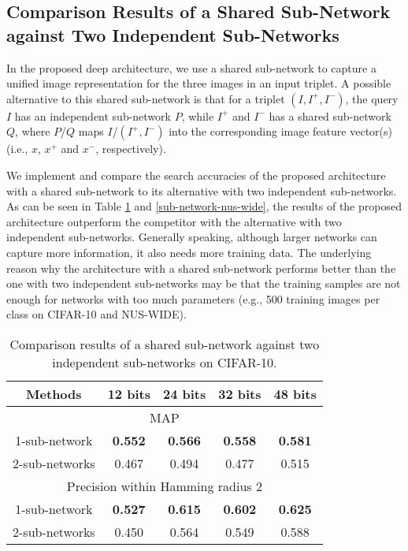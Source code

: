 \documentclass[10pt,twocolumn,letterpaper]{article}
\begin{document}
\subsection{Comparison Results of a Shared Sub-Network against Two Independent Sub-Networks}
In the proposed deep architecture, we use a shared sub-network to capture a unified image representation for the three images in an input
triplet. A possible alternative to this shared sub-network is that for a triplet $(I,I^+,I^-)$, the query $I$ has an independent sub-network $P$, while $I^+$ and $I^-$ has a shared sub-network $Q$, where $P$/$Q$ maps $I$/$(I^+,I^-)$ into the corresponding image
feature vector(s) (i.e., $x$, $x^+$ and $x^-$, respectively).

We implement and compare the search accuracies of the proposed architecture with a shared sub-network to its alternative with two independent sub-networks. As can be seen in Table \ref{sub-network-cifar} and \ref{sub-network-nus-wide}, the results of the proposed architecture outperform the competitor with the alternative with two independent sub-networks. Generally speaking, although larger networks can capture more information, it also needs more training data. The underlying reason why the architecture with a shared sub-network performs better than the one with two independent sub-networks may be that the training samples are not enough for networks with too much parameters (e.g., 500 training images per class on CIFAR-10 and NUS-WIDE).

 \begin{table}[ht!]
\small
    \centering \caption{Comparison results of a shared sub-network against two independent sub-networks on CIFAR-10.}
    \begin{tabular}{|c|c c c c|}
         \hline
Methods & 12 bits & 24 bits & 32 bits & 48 bits  \\
        \hline
        \multicolumn{5}{|c|}{MAP} \\
        \hline
        1-sub-network  & {\bf 0.552 }& {\bf 0.566} & {\bf 0.558} & {\bf 0.581}  \\
        \hline
        2-sub-networks
         &  0.467 & 0.494 & 0.477 & 0.515 \\
         \hline
         \multicolumn{5}{|c|}{Precision within Hamming radius 2} \\
        \hline
        1-sub-network  & {\bf 0.527 }& {\bf 0.615} & {\bf 0.602} & {\bf 0.625}  \\
        \hline
        2-sub-networks
         & 0.450 &  0.564 & 0.549 & 0.588 \\
         \hline
        \end{tabular}
    \label{sub-network-cifar}
\end{table}
\end{document}
